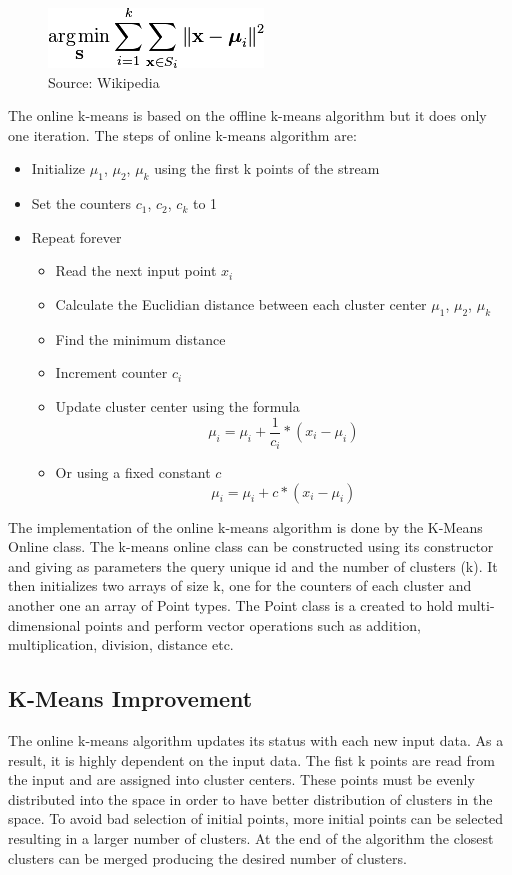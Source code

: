 \documentclass{lmproj}
\begin{document}
\begin{figure}[hp]
	\centering	
	\includegraphics[scale=1.5]{kmeans}
	\caption{Source: Wikipedia}
\end{figure}

The online k-means is based on the offline k-means algorithm but it does only one iteration. The steps of online k-means algorithm are:

\begin{itemize}
	\item Initialize $\mu_{1}$, $\mu_{2}$, $\mu_{k}$  using the first k points of the stream
	\item Set the counters $c_{1}$, $c_{2}$, $c_{k}$  to 1
	\item Repeat forever
	\begin{itemize}
	\item Read the next input point $x_{i}$
	\item Calculate the Euclidian distance between each cluster center $\mu_{1}$, $\mu_{2}$, $\mu_{k}$
	\item Find the minimum distance
	\item Increment counter $c_{i}$
	\item Update cluster center using the formula
	\[ \mu_{i} = \mu_{i} + \frac{1}{c_{i}} * (x_{i} - \mu_{i} )\]
	\item Or using a fixed constant $c$
	\[ \mu_{i} = \mu_{i} + c * (x_{i} - \mu_{i} )\]
	\end{itemize}
\end{itemize}

The implementation of the online k-means algorithm is done by the K-Means Online class. The k-means online class can be constructed using its constructor and giving as parameters the query unique id and the number of clusters (k). It then initializes two arrays of size k, one for the counters of each cluster and another one an array of Point types. The Point class is a created to hold multi-dimensional points and perform vector operations such as addition, multiplication, division, distance etc. 

\subsection{K-Means Improvement}

The online k-means algorithm updates its status with each new input data. As a result, it is highly dependent on the input data. The fist k points are read from the input and are assigned into cluster centers. These points must be evenly distributed into the space in order to have better distribution of clusters in the space. To avoid bad selection of initial points, more initial points can be selected resulting in a larger number of clusters. At the end of the algorithm the closest clusters can be merged producing the desired number of clusters.
\end{document}
